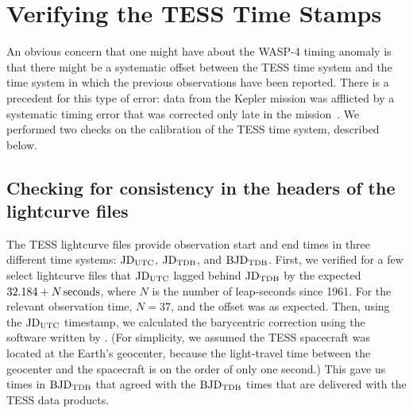 \documentclass[12pt,twocolumn,tighten]{aastex62}
\begin{document}






\clearpage

                            
 


\appendix

\section{Verifying the TESS Time Stamps}
\label{sec:verify_tess}

An obvious concern that one might have about the WASP-4 timing anomaly
is that there might be a systematic offset between the TESS time
system and the time system in which the previous observations have
been reported.  There is a precedent for this type of error: data from
the Kepler mission was afflicted by a systematic timing error that was
corrected only late in the mission~\citep[][Section
  3.4]{kepler_DR19_2013}. We performed two checks on the calibration
of the TESS time system, described below.

\subsection{Checking for consistency in the headers of the lightcurve files}
\label{sec:headers}

The TESS lightcurve files provide observation start and end times in
three different time systems: ${\rm JD}_{\rm UTC}$, ${\rm JD}_{\rm
TDB}$, and ${\rm BJD}_{\rm TDB}$.  First, we verified for a few select
lightcurve files that ${\rm JD}_{\rm UTC}$ lagged behind ${\rm
JD}_{\rm TDB}$ by the expected $32.184 + N\,{\rm seconds}$, where $N$
is the number of leap-seconds since 1961. For the relevant observation
time, $N=37$, and the offset was as expected.  Then, using the ${\rm
JD}_{\rm UTC}$ timestamp, we calculated the barycentric correction
using the software written by \citealt{eastman_achieving_2010}.  (For
simplicity, we assumed the TESS spacecraft was located at the Earth's
geocenter, because the light-travel time between the geocenter and the
spacecraft is on the order of only one second.)  This gave us times in
${\rm BJD}_{\rm TDB}$ that agreed with the ${\rm BJD}_{\rm TDB}$ times
that are delivered with the TESS data products.
\end{document}

